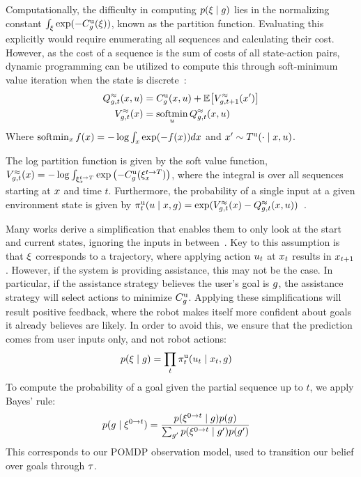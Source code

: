 Computationally, the difficulty in computing $p(\xi \mid g)$ lies in the normalizing constant $\int_{\xi} \exp(-C_g^{\text{u}}(\xi))$, known as the partition function. Evaluating this explicitly would require enumerating all sequences and calculating their cost. However, as the cost of a sequence is the sum of costs of all state-action pairs, dynamic programming can be utilized to compute this through soft-minimum value iteration when the state is discrete~\citep{ziebart_2009,ziebart_2012}:
\begin{align*}
  Q^{\approx}_{ g,{t}}(x, u) &= C_g^{\text{u}}(x, u) + \mathbb{E}\!\left[V^{\approx}_{ g,{t+1}}(x')\right]\\
  V^{\approx}_{ g,{t}}(x) &= \operatorname*{\text{soft}\!\min}_{u} Q^{\approx}_{ g,{t}}(x, u)
\end{align*}
Where $\operatorname*{\text{soft}\!\min}_{x} f(x) = - \log \int_{x} \exp(-f(x)) dx$ and $x' \sim T^{\text{u}}(\cdot \mid x, u)$.

The log partition function is given by the soft value function, $V^{\approx}_{ g,{t}}(x) = - \log \int_{\xi_{x}^{t \rightarrow T}} \exp\left(-C_g^{\text{u}}(\xi_{x}^{t \rightarrow T})\right)$, where the integral is over all sequences starting at $x$ and time $t$. Furthermore, the probability of a single input at a given environment state is given by $\pi^{\text{u}}_t(u \mid x, g) = \exp(V^{\approx}_{ g,{t}}(x) -Q^{\approx}_{ g,{t}}(x, u))$~\citep{ziebart_2009}.

Many works derive a simplification that enables them to only look at the start and current states, ignoring the inputs in between~\citep{ziebart_2012, dragan_2013_assistive}. Key to this assumption is that $\xi$ corresponds to a trajectory, where applying action $u_t$ at $x_t$ results in $x_{t+1}$. However, if the system is providing assistance, this may not be the case. In particular, if the assistance strategy believes the user's goal is $g$, the assistance strategy will select actions to minimize $C^{\text{u}}_g$. Applying these simplifications will result positive feedback, where the robot makes itself more confident about goals it already believes are likely. In order to avoid this, we ensure that the prediction comes from user inputs only, and not robot actions:
\begin{align*}
  p(\xi \mid g) &= \prod_t \pi^{\text{u}}_t(u_{t} \mid x_t, g)
\end{align*}
To compute the probability of a goal given the partial sequence up to $t$, we apply Bayes' rule:
\begin{align*}
  p(g \mid \xi^{0 \rightarrow t}) &= \frac{p(\xi^{0 \rightarrow t} \mid g) p(g) }{\sum_{g'} p(\xi^{0 \rightarrow t} \mid g') p(g')}
\end{align*}
This corresponds to our POMDP observation model, used to transition our belief over goals through $\tau$.


